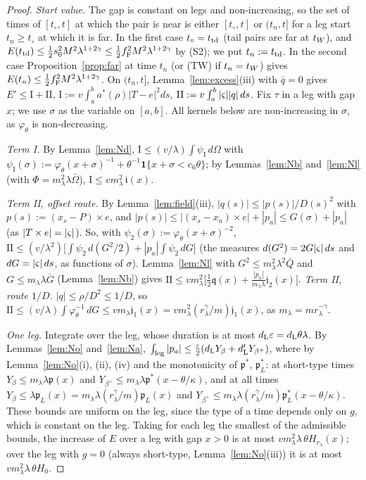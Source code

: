 \begin{proof}
\emph{Start value.} The gap is constant on legs and non-increasing, so the set of times of $[t_\circ,t]$ at which the pair is near
is either $[t_\circ,t]$ or $(t_n,t]$ for a leg start $t_n\ge t_\circ$ at which it is far. In the first case $t_\circ=t_{\mathrm{td}}$ (tail pairs
are far at $t_W$), and $E(t_{\mathrm{td}})\le\frac12s_0^2M^2\lambda^{1+2\gamma}\le\frac12f_{\mathrm F}^2M^2\lambda^{1+2\gamma}$ by (S2); we put $t_n:=t_{\mathrm{td}}$. In the
second case Proposition~\ref{prop:far} at time $t_n$ (or (TW) if $t_n=t_W$) gives $E(t_n)\le\frac12f_{\mathrm F}^2M^2\lambda^{1+2\gamma}$. On $(t_n,t]$,
Lemma~\ref{lem:excess}(iii) with $\bar q=0$ gives $E'\le\mathrm I+\mathrm{II}$, $\mathrm I:=v\int_a^ba^*(\rho)|T-e|^2ds$,
$\mathrm{II}:=v\int_a^b|\varsigma||q|\,ds$. Fix $\tau$ in a leg with gap $x$; we use $\sigma$ as the variable on $[a,b]$. All kernels below are
non-increasing in $\sigma$, as $\varphi_\theta$ is non-decreasing.

\emph{Term \textup{I}.} By Lemma~\ref{lem:Nd}, $\mathrm I\le(v/\lambda)\int\psi_{\mathrm I}\,d\Omega$ with
$\psi_{\mathrm I}(\sigma):=\varphi_\theta(x+\sigma)^{-1}+\theta^{-1}\mathbf 1\{x+\sigma<c_6\theta\}$; by Lemmas~\ref{lem:Nb} and~\ref{lem:Nl}
(with $\Phi=m_\lambda^2\lambda\bar\Omega$), $\mathrm I\le vm_\lambda^2\,\mathfrak i(x)$.

\emph{Term \textup{II}, offset route.} By Lemma~\ref{lem:field}(iii), $|q(s)|\le|p(s)|/D(s)^2$ with $p(s):=(x_s-P)\times e$, and
$|p(s)|\le|(x_s-x_a)\times e|+|p_a|\le G(\sigma)+|p_a|$ (as $|T\times e|=|\varsigma|$). So, with $\psi_2(\sigma):=\varphi_\theta(x+\sigma)^{-2}$,
$\mathrm{II}\le(v/\lambda^2)\bigl[\int\psi_2\,d(G^2/2)+|p_a|\int\psi_2\,dG\bigr]$ (the measures $d(G^2)=2G|\varsigma|\,ds$ and $dG=|\varsigma|\,ds$,
as functions of $\sigma$). Lemma~\ref{lem:Nl} with $G^2\le m_\lambda^2\lambda^2\bar Q$ and $G\le m_\lambda\lambda\bar G$ (Lemma~\ref{lem:Nb})
gives $\mathrm{II}\le vm_\lambda^2\bigl[\frac12\mathfrak q(x)+\frac{|p_a|}{m_\lambda\lambda}\mathfrak j_2(x)\bigr]$.
\emph{Term \textup{II}, route $1/D$.} $|q|\le\rho/D^2\le1/D$, so $\mathrm{II}\le(v/\lambda)\int\varphi_\theta^{-1}\,dG\le vm_\lambda\mathfrak j_1(x)
=vm_\lambda^2(r_\lambda^\gamma/m)\mathfrak j_1(x)$, as $m_\lambda=mr_\lambda^{-\gamma}$.

\emph{One leg.} Integrate over the leg, whose duration is at most $d_{\mathrm L}\varepsilon=d_{\mathrm L}\theta\lambda$. By Lemmas~\ref{lem:No} and~\ref{lem:Na},
$\int_{\mathrm{leg}}|p_a|\le\frac{\varepsilon}2(d_{\mathrm L} Y_\beta+d_{\mathrm L}'Y_{\beta^+})$, where by Lemma~\ref{lem:No}(i), (ii), (iv) and the monotonicity of
$\mathfrak p^*$, $\mathfrak p_L^*$: at short-type times $Y_\beta\le m_\lambda\lambda\mathfrak p(x)$ and $Y_{\beta^+}\le m_\lambda\lambda\mathfrak p^*(x-\theta/\kappa)$,
and at all times $Y_\beta\le\lambda\mathfrak p_L(x)=m_\lambda\lambda(r_\lambda^\gamma/m)\mathfrak p_L(x)$ and
$Y_{\beta^+}\le m_\lambda\lambda(r_\lambda^\gamma/m)\mathfrak p_L^*(x-\theta/\kappa)$. These bounds are uniform on the leg, since the type of a time
depends only on $g$, which is constant on the leg. Taking for each leg the smallest of the admissible bounds, the increase of $E$ over a
leg with gap $x>0$ is at most $vm_\lambda^2\lambda\,\theta H_{r_\lambda}(x)$; over the leg with $g=0$ (always short-type,
Lemma~\ref{lem:No}(iii)) it is at most $vm_\lambda^2\lambda\,\theta H_0$.


\end{proof}
